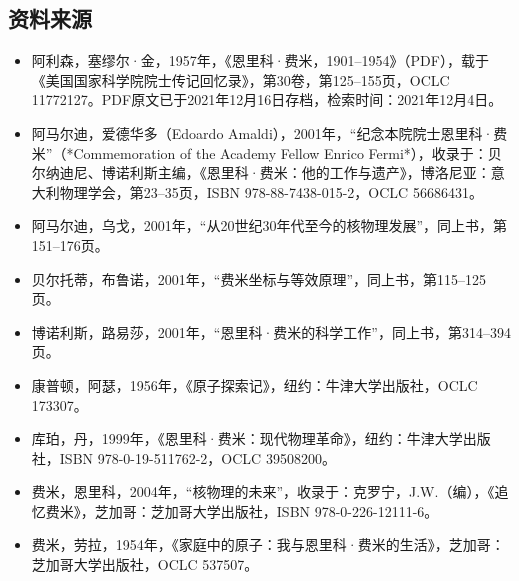 \subsection{资料来源}
\begin{itemize}
\item 阿利森，塞缪尔·金，1957年，《恩里科·费米，1901–1954》（PDF），载于《美国国家科学院院士传记回忆录》，第30卷，第125–155页，OCLC 11772127。PDF原文已于2021年12月16日存档，检索时间：2021年12月4日。
\item 阿马尔迪，爱德华多（Edoardo Amaldi），2001年，“纪念本院院士恩里科·费米”（*Commemoration of the Academy Fellow Enrico Fermi*），收录于：贝尔纳迪尼、博诺利斯主编，《恩里科·费米：他的工作与遗产》，博洛尼亚：意大利物理学会，第23–35页，ISBN 978-88-7438-015-2，OCLC 56686431。
\item 阿马尔迪，乌戈，2001年，“从20世纪30年代至今的核物理发展”，同上书，第151–176页。
\item 贝尔托蒂，布鲁诺，2001年，“费米坐标与等效原理”，同上书，第115–125页。
\item 博诺利斯，路易莎，2001年，“恩里科·费米的科学工作”，同上书，第314–394页。
\item 康普顿，阿瑟，1956年，《原子探索记》，纽约：牛津大学出版社，OCLC 173307。
\item 库珀，丹，1999年，《恩里科·费米：现代物理革命》，纽约：牛津大学出版社，ISBN 978-0-19-511762-2，OCLC 39508200。
\item 费米，恩里科，2004年，“核物理的未来”，收录于：克罗宁，J.W.（编），《追忆费米》，芝加哥：芝加哥大学出版社，ISBN 978-0-226-12111-6。
\item 费米，劳拉，1954年，《家庭中的原子：我与恩里科·费米的生活》，芝加哥：芝加哥大学出版社，OCLC 537507。

\end{itemize}